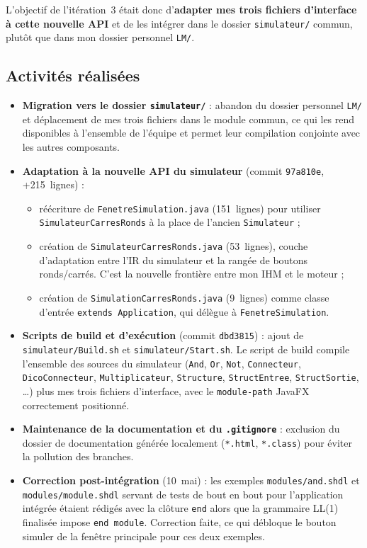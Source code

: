 \documentclass[11pt,a4paper]{article}
\begin{document}
L'objectif de l'it\'eration~3 \'etait donc d'\textbf{adapter mes trois fichiers d'interface \`a cette nouvelle API} et de les int\'egrer dans le dossier \texttt{simulateur/} commun, plut\^ot que dans mon dossier personnel \texttt{LM/}.

\subsection*{Activit\'es r\'ealis\'ees}

\begin{itemize}
  \item \textbf{Migration vers le dossier \texttt{simulateur/}} : abandon du dossier personnel \texttt{LM/} et d\'eplacement de mes trois fichiers dans le module commun, ce qui les rend disponibles \`a l'ensemble de l'\'equipe et permet leur compilation conjointe avec les autres composants.
  \item \textbf{Adaptation \`a la nouvelle API du simulateur} (commit \texttt{97a810e}, +215~lignes) :
  \begin{itemize}
    \item r\'e\'ecriture de \texttt{FenetreSimulation.java} (151~lignes) pour utiliser \texttt{SimulateurCarresRonds} \`a la place de l'ancien \texttt{Simulateur} ;
    \item cr\'eation de \texttt{SimulateurCarresRonds.java} (53~lignes), couche d'adaptation entre l'IR du simulateur et la rang\'ee de boutons ronds/carr\'es. C'est la nouvelle fronti\`ere entre mon IHM et le moteur ;
    \item cr\'eation de \texttt{SimulationCarresRonds.java} (9~lignes) comme classe d'entr\'ee \texttt{extends Application}, qui d\'el\`egue \`a \texttt{FenetreSimulation}.
  \end{itemize}
  \item \textbf{Scripts de build et d'ex\'ecution} (commit \texttt{dbd3815}) : ajout de \texttt{simulateur/Build.sh} et \texttt{simulateur/Start.sh}. Le script de build compile l'ensemble des sources du simulateur (\texttt{And}, \texttt{Or}, \texttt{Not}, \texttt{Connecteur}, \texttt{DicoConnecteur}, \texttt{Multiplicateur}, \texttt{Structure}, \texttt{StructEntree}, \texttt{StructSortie}, \dots) plus mes trois fichiers d'interface, avec le \texttt{module-path} JavaFX correctement positionn\'e.
  \item \textbf{Maintenance de la documentation et du \texttt{.gitignore}} : exclusion du dossier de documentation g\'en\'er\'ee localement (\texttt{*.html}, \texttt{*.class}) pour \'eviter la pollution des branches.
  \item \textbf{Correction post-int\'egration} (10~mai) : les exemples \texttt{modules/and.shdl} et \texttt{modules/module.shdl} servant de tests de bout en bout pour l'application int\'egr\'ee \'etaient r\'edig\'es avec la cl\^oture \texttt{end} alors que la grammaire LL(1) finalis\'ee impose \texttt{end~module}. Correction faite, ce qui d\'ebloque le bouton \og simuler \fg{} de la fen\^etre principale pour ces deux exemples.
\end{itemize}
\end{document}
